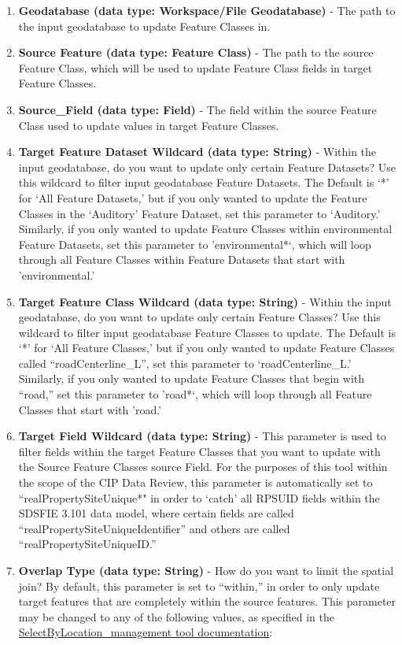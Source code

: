 \documentclass[openany]{book}
\theoremstyle{definition}
\theoremstyle{definition}
\theoremstyle{definition}
\theoremstyle{remark}
\begin{document}
\begin{enumerate}
\def\labelenumi{\arabic{enumi}.}
\item
  \textbf{Geodatabase (data type: Workspace/File Geodatabase)} - The
  path to the input geodatabase to update Feature Classes in.
\item
  \textbf{Source Feature (data type: Feature Class)} - The path to the
  source Feature Class, which will be used to update Feature Class
  fields in target Feature Classes.
\item
  \textbf{Source\_Field (data type: Field)} - The field within the
  source Feature Class used to update values in target Feature Classes.
\item
  \textbf{Target Feature Dataset Wildcard (data type: String)} - Within
  the input geodatabase, do you want to update only certain Feature
  Datasets? Use this wildcard to filter input geodatabase Feature
  Datasets. The Default is `*' for `All Feature Datasets,' but if you
  only wanted to update the Feature Classes in the `Auditory' Feature
  Dataset, set this parameter to `Auditory.' Similarly, if you only
  wanted to update Feature Classes within environmental Feature
  Datasets, set this parameter to 'environmental*`, which will loop
  through all Feature Classes within Feature Datasets that start with
  'environmental.'
\item
  \textbf{Target Feature Class Wildcard (data type: String)} - Within
  the input geodatabase, do you want to update only certain Feature
  Classes? Use this wildcard to filter input geodatabase Feature Classes
  to update. The Default is `*' for `All Feature Classes,' but if you
  only wanted to update Feature Classes called ``roadCenterline\_L'',
  set this parameter to `roadCenterline\_L.' Similarly, if you only
  wanted to update Feature Classes that begin with ``road,'' set this
  parameter to 'road*`, which will loop through all Feature Classes that
  start with 'road.'
\item
  \textbf{Target Field Wildcard (data type: String)} - This parameter is
  used to filter fields within the target Feature Classes that you want
  to update with the Source Feature Classes source Field. For the
  purposes of this tool within the scope of the CIP Data Review, this
  parameter is automatically set to ``realPropertySiteUnique*" in order
  to `catch' all RPSUID fields within the SDSFIE 3.101 data model, where
  certain fields are called ``realPropertySiteUniqueIdentifier'' and
  others are called ``realPropertySiteUniqueID.''
\item
  \textbf{Overlap Type (data type: String)} - How do you want to limit
  the spatial join? By default, this parameter is set to ``within,'' in
  order to only update target features that are completely within the
  source features. This parameter may be changed to any of the following
  values, as specified in the
  \href{http://desktop.arcgis.com/en/arcmap/latest/tools/data-management-toolbox/select-layer-by-location.htm}{SelectByLocation\_management
  tool documentation}:


\end{enumerate}
\end{document}
